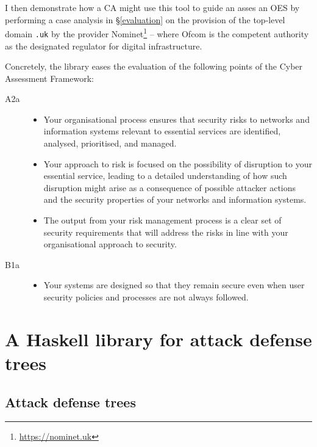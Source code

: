 \documentclass{scrreprt}
\begin{document}
I then demonstrate how a CA might use this tool to guide an asses an OES by
performing a case analysis in \S\ref{evaluation} on the provision of the
top-level domain \texttt{.uk} by the provider
Nominet\footnote{\url{https://nominet.uk}} -- where Ofcom is the competent
authority as the designated regulator for digital infrastructure.


Concretely, the library eases the evaluation of the following points of the
Cyber Assessment Framework:

\begin{description}
    \item [A2a]
        \begin{itemize}
            \item Your organisational process ensures that security risks to
                networks and information systems relevant to essential services
                are identified, analysed, prioritised, and managed.
            \item Your approach to risk is focused on the possibility of
                disruption to your essential service, leading to a detailed
                understanding of how such disruption might arise as a
                consequence of possible attacker actions and the security
                properties of your networks and information systems.
            \item The output from your risk management process is a clear set of
                security requirements that will address the risks in line with
                your organisational approach to security.
        \end{itemize}

    \item [B1a]
        \begin{itemize}
            \item Your systems are designed so that they remain secure even when
                user security policies and processes are not always followed.
        \end{itemize}
\end{description}

\label{tool}
\chapter{A Haskell library for attack defense trees}

\section{Attack defense trees}
\end{document}
